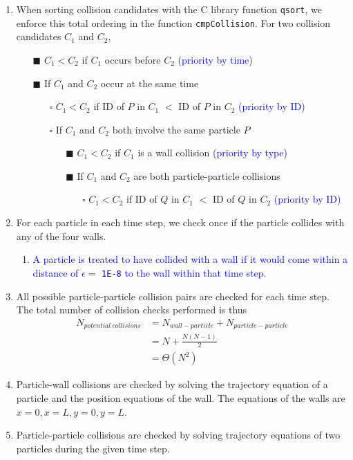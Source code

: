 \documentclass[12pt]{article}
\begin{document}
\begin{enumerate}
\begin{enumerate}
	\end{enumerate}
	\item When sorting collision candidates with the C library function \texttt{qsort}, we enforce this total ordering in the function \texttt{cmpCollision}. For two collision candidates  $C_1$ and $C_2$,
	\begin{itemize}
		\item[$\blacksquare$] $C_1 < C_2$ if $C_1$ occurs before $C_2$ \textcolor{blue}{(priority by time)}
		\item[$\blacksquare$] If $C_1$ and $C_2$ occur at the same time
		\begin{itemize}
			\item[$\square$] $C_1 < C_2$ if ID of $P$ in $C_1$ $<$ ID of $P$ in $C_2$ \textcolor{blue}{(priority by ID)}
			\item[$\square$] If $C_1$ and $C_2$ both involve the same particle $P$
				\begin{itemize}
					\item[$\blacksquare$] $C_1 < C_2$ if $C_1$ is a wall collision \textcolor{blue}{(priority by type)}
					\item[$\blacksquare$] If $C_1$ and $C_2$ are both particle-particle collisions
						\begin{itemize}
							\item[$\square$] $C_1 < C_2$ if ID of $Q$ in $C_1$ $<$ ID of $Q$ in $C_2$ \textcolor{blue}{(priority by ID)}
						\end{itemize}
				\end{itemize}
		\end{itemize}
	\end{itemize}
	\item For each particle in each time step, we check once if the particle collides with any of the four walls.
	    \begin{enumerate}
	        \item \textcolor{blue}{A particle is treated to have collided with a wall if it would come within a distance of $\epsilon = $ \texttt{1E-8} to the wall within that time step.}
	    \end{enumerate}
	\item All possible particle-particle collision pairs are checked for each time step. The total number of collision checks performed is thus
	\begin{align*}
	N_{potential\ collisions} 	&= N_{wall-particle} + N_{particle-particle} \\
						&= N + \frac{N(N-1)}{2} \\
						&= \Theta (N^2)
	\end{align*}
	\item Particle-wall collisions are checked by solving the trajectory equation of a particle and the position equations of the wall. The equations of the walls are $x = 0, x = L, y = 0, y = L$.
	\item \label{trajectory-calc} Particle-particle collisions are checked by solving trajectory equations of two particles during the given time step.\\
	

\end{enumerate}
\end{document}
